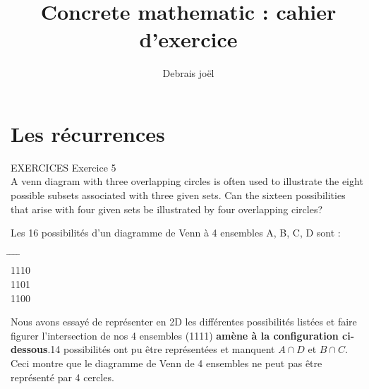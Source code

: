 \documentclass[9pt]{amsart}
\begin{document}
\title{Concrete mathematic : cahier d'exercice}
\author{Debrais joël}
\maketitle
\section{Les récurrences}
\noindent EXERCICES\newline\newline
Exercice 5\\
A venn diagram with three overlapping circles is often used to illustrate the eight possible subsets associated with three given sets. 
Can the sixteen possibilities that arise with four given sets be illustrated by four overlapping circles?\newline

Les 16 possibilités d'un diagramme de Venn à 4 ensembles A, B, C, D sont : 
\begin{tabbing}
\hspace{1.5cm} \= \hspace{1.5cm} \= \hspace{1.5cm} \= \hspace{1.5cm} \=     \\
1110    \\
1101    \\
1100   
\end{tabbing}
 Nous avons essayé de représenter en 2D les différentes possibilités listées et faire figurer l'intersection de nos 4 ensembles (1111)
 \textbf{amène à la configuration ci-dessous}.14 possibilités ont pu être représentées et manquent $A \cap D$ et $B \cap C$. Ceci montre que le diagramme
 de Venn de 4 ensembles ne peut pas être représenté par 4 cercles.\newline
\end{document}
